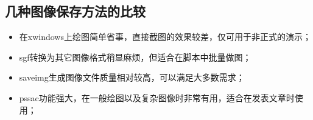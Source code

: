 \subsection{几种图像保存方法的比较}
\begin{itemize}
\item 在xwindows上绘图简单省事，直接截图的效果较差，仅可用于非正式的演示；
\item sgf转换为其它图像格式稍显麻烦，但适合在脚本中批量做图；
\item saveimg生成图像文件质量相对较高，可以满足大多数需求；
\item pssac功能强大，在一般绘图以及复杂图像时非常有用，适合在发表文章时使用；
\end{itemize}
